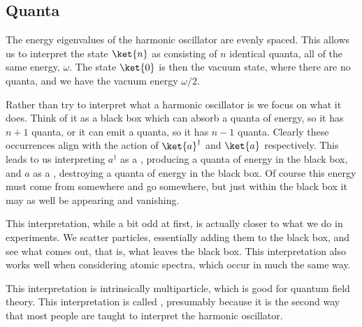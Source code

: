 \documentclass[fleqn]{NotesClass}
\newcommand{\hermit}{{\dagger}}
\begin{document}
    \subsection{Quanta}
    The energy eigenvalues of the harmonic oscillator are evenly spaced.
    This allows us to interpret the state \(\ket{n}\) as consisting of \(n\) identical quanta, all of the same energy, \(\omega\).
    The state \(\ket{0}\) is then the vacuum state, where there are no quanta, and we have the vacuum energy \(\omega/2\).
    
    Rather than try to interpret what a harmonic oscillator is we focus on what it does.
    Think of it as a black box which can absorb a quanta of energy, so it has \(n + 1\) quanta, or it can emit a quanta, so it has \(n - 1\) quanta.
    Clearly these occurrences align with the action of \(\ket{a}^\hermit\) and \(\ket{a}\) respectively.
    This leads to us interpreting \(a^\hermit\) as a , producing a quanta of energy in the black box, and \(a\) as a , destroying a quanta of energy in the black box.
    Of course this energy must come from somewhere and go somewhere, but just within the black box it may as well be appearing and vanishing.
    
    This interpretation, while a bit odd at first, is actually closer to what we do in experiments.
    We scatter particles, essentially adding them to the black box, and see what comes out, that is, what leaves the black box.
    This interpretation also works well when considering atomic spectra, which occur in much the same way.
    
    This interpretation is intrinsically multiparticle, which is good for quantum field theory.
    This interpretation is called , presumably because it is the second way that most people are taught to interpret the harmonic oscillator.
    
\end{document}
